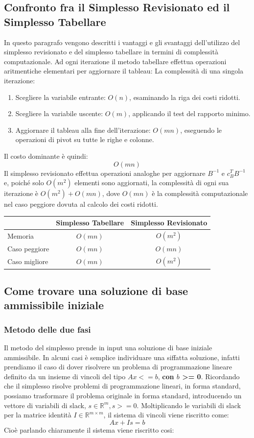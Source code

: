 \subsection{Confronto fra il Simplesso Revisionato ed il Simplesso Tabellare}
In questo paragrafo vengono descritti i vantaggi e gli svantaggi dell'utilizzo
del simplesso revisionato e del simplesso tabellare in termini di complessità
computazionale.
Ad ogni iterazione il metodo tabellare effettua operazioni aritmentiche
elementari per aggiornare il tableau:
La complessità di una singola iterazione:
\begin{enumerate}
    \item Scegliere la variabile entrante: \(O(n)\), esaminando la riga dei costi ridotti.
    \item Scegliere la variabile uscente: \(O(m)\), applicando il test del rapporto minimo.
    \item Aggiornare il tableau alla fine dell'iterazione: \(O(mn)\), eseguendo le operazioni di pivot su tutte le righe e colonne.
\end{enumerate}
Il costo dominante è quindi:
\[
\boxed{O(mn)}
\]
Il simplesso revisionato effettua operazioni analoghe per aggiornare
$B^{-1}$ e $c_B^{T}B^{-1}$ e, poiché solo $O(m^2)$ elementi sono
aggiornati, la complessità di ogni sua iterazione è
$O(m^2) + O(mn)$, dove $O(mn)$ è la complessità computazionale
nel caso peggiore dovuta al calcolo dei costi ridotti.

\begin{center}
\begin{tabular}{lcc}
& Simplesso Tabellare & Simplesso Revisionato \\
\hline
Memoria & $O(mn)$ & $O(m^2)$ \\
Caso peggiore & $O(mn)$ & $O(mn)$ \\
Caso migliore & $O(mn)$ & $O(m^2)$ \\
\end{tabular}
\end{center}

\subsection{Come trovare una soluzione di base ammissibile iniziale}
\subsubsection{Metodo delle due fasi}
Il metodo del simplesso prende in input una soluzione di base iniziale ammissibile.
In alcuni casi è semplice individuare una siffatta soluzione, infatti prendiamo il caso di dover risolvere un problema di programmazione lineare definito da un insieme di vincoli del tipo $Ax <= b$, \textbf{con $b$ >= 0}.
Ricordando che il simplesso risolve problemi di programmazione lineari, in forma standard, possiamo trasformare il problema originale in forma standard, introducendo un vettore di variabili di slack, $s \in \mathbb{R} ^m, s >= 0$.
Moltiplicando le variabili di slack per la matrice identità $I \in \mathbb{R}^{m \times m}$, il sistema di vincoli viene riscritto come:
$$Ax + Is = b$$
Cioè parlando chiaramente il sistema viene riscritto cosi:

